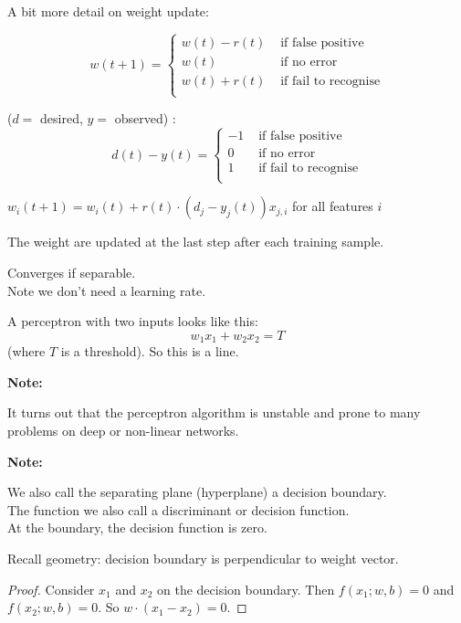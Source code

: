 A bit more detail on weight update:

\begin{displaymath}
w(t+1) = \left\{
\begin{array}{ll}
  w(t) - r(t) & \mbox{ if false positive} \\
  w(t) & \mbox{ if no error} \\
  w(t) + r(t) & \mbox{ if fail to recognise} \\
\end{array} \right.
\end{displaymath}

 ($d=$ desired, $y=$ observed) :
\begin{displaymath}
  d(t) - y(t) = \left\{
\begin{array}{ll}
  -1 & \mbox{ if  false positive} \\
  0 & \mbox{ if no error} \\
  1 & \mbox{ if fail to recognise} \\
\end{array} \right.
\end{displaymath}

 $w_i(t+1) = w_i(t) + r(t)\cdot (d_j - y_j(t)) x_{j,i}$ for all features $i$

The weight are updated at the last step after each training sample.

Converges if separable.\\
Note we don't need a learning rate.

A perceptron with two inputs looks like this:
\begin{displaymath}
  w_1 x_1 + w_2 x_2 = T
\end{displaymath}
(where $T$ is a threshold).  So this is a line.


\bigskip
\textbf{Note:}

It turns out that the perceptron algorithm is unstable and prone to
many problems on deep or non-linear networks.


\bigskip
\textbf{Note:}

We also call the separating plane (hyperplane) a decision boundary. \\
The function we also call a discriminant or decision function.\\
At the boundary, the decision function is zero.

Recall geometry: decision boundary is perpendicular to weight vector.

\begin{proof}
  Consider $x_1$ and $x_2$ on the decision boundary.  Then
  $f(x_1; w, b) = 0$ and $f(x_2; w, b) = 0$.  So
  $w\cdot (x_1 - x_2) = 0$.
\end{proof}


